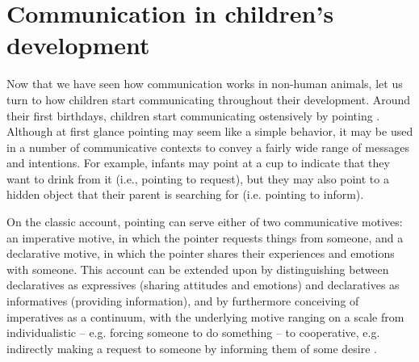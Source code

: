 \section{Communication in children's development}
\label{sec:comm:ontogeny}


Now that we have seen how communication works in non-human animals, let us turn to how children start communicating throughout their development.
Around their first birthdays, children start communicating ostensively by pointing \citep{Tomasello08}.
Although at first glance pointing may seem like a simple behavior, it may be used in a number of communicative contexts to convey a fairly wide range of messages and intentions.
For example, infants may point at a cup to indicate that they want to drink from it (i.e., pointing to request), but they may also point to a hidden object that their parent is searching for (i.e. pointing to inform).

On the classic account, pointing can serve either of two communicative motives: an imperative motive, in which the pointer requests things from someone, and a declarative motive, in which the pointer shares their experiences and emotions with someone.
This account can be extended upon by distinguishing between declaratives as expressives (sharing attitudes and emotions) and declaratives as informatives (providing information), and by furthermore conceiving of imperatives as a continuum, with the underlying motive ranging on a scale from individualistic -- e.g. forcing someone to do something -- to cooperative, e.g. indirectly making a request to someone by informing them of some desire \citep{Tomasello08}.

